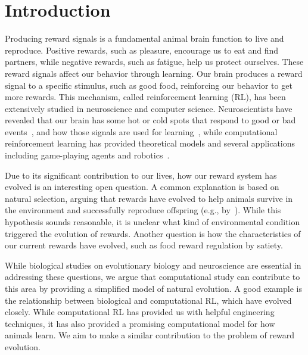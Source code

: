 \section{Introduction}\label{sec:intro}
Producing reward signals is a fundamental animal brain function to live and reproduce. Positive rewards, such as pleasure, encourage us to eat and find partners, while negative rewards, such as fatigue, help us protect ourselves. These reward signals affect our behavior through learning. Our brain produces a reward signal to a specific stimulus, such as good food, reinforcing our behavior to get more rewards. This mechanism, called reinforcement learning (RL), has been extensively studied in neuroscience and computer science. Neuroscientists have revealed that our brain has some hot or cold spots that respond to good or bad events~\citep{berridgeAffectiveNeurosciencePleasure2008}, and how those signals are used for learning~\citep{schultzNeuronalRewardDecision2015}, while computational reinforcement learning has provided theoretical models and several applications including game-playing agents and robotics~\citep{suttonReinforcementLearningIntroduction2018}.

Due to its significant contribution to our lives, how our reward system has evolved is an interesting open question. A common explanation is based on natural selection, arguing that rewards have evolved to help animals survive in the environment and successfully reproduce offspring (e.g., by~\cite{schultzNeuronalRewardDecision2015}). While this hypothesis sounds reasonable, it is unclear what kind of environmental condition triggered the evolution of rewards. Another question is how the characteristics of our current rewards have evolved, such as food reward regulation by satiety.

While biological studies on evolutionary biology and neuroscience are essential in addressing these questions, we argue that computational study can contribute to this area by providing a simplified model of natural evolution. A good example is the relationship between biological and computational RL, which have evolved closely. While computational RL has provided us with helpful engineering techniques, it has also provided a promising computational model for how animals learn. We aim to make a similar contribution to the problem of reward evolution.


